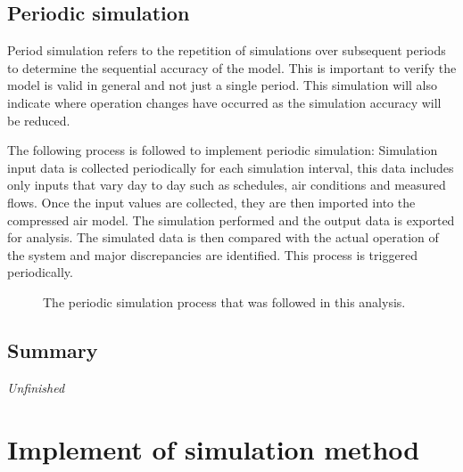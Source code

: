 	\subsection{Periodic simulation}	
		Period simulation refers to the repetition of simulations over subsequent periods to determine the sequential accuracy of the model.  This is important to verify the model is valid in general and not just a single period.  This simulation will also indicate where operation changes have occurred as the simulation accuracy will be reduced.
		\par 
		The following process is followed to implement periodic simulation: Simulation input data is collected periodically for each simulation interval, this data includes only inputs that vary day to day such as schedules, air conditions and  measured flows. Once the input values are collected, they are then imported into the compressed air model. The simulation performed and the output data is exported for analysis. The  simulated data is then compared with the actual operation of the system and major discrepancies are identified. This process is triggered periodically.
		\begin{figure}[h]
			\centering
			\caption{The periodic simulation process that was followed in this analysis.}
			\label{fig: PeriodicProcess}
		\end{figure}
	
	\subsection{Summary}
	\textit{Unfinished}
\newpage
\section{Implement of simulation method}
